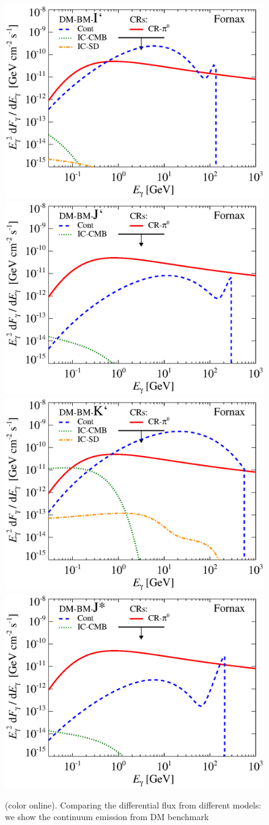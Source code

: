 \documentclass[10pt,aps,pra,reprint,amsmath,amsfonts,amssymb,showpacs,nofootinbib,floatfix]{revtex4-1}
\newcommand{\colo}{(color online). }
\begin{document}
\begin{figure}
\begin{minipage}{2.0\columnwidth}
 \includegraphics[width=0.49\columnwidth]{figures/flux.BMcompI.v14.0.1deg.1.6T.SubMass.IR2.noMW.woGal.eps}
\includegraphics[width=0.49\columnwidth]{figures/flux.BMcompJ.v14.0.1deg.1.6T.SubMass.IR2.noMW.woGal.eps}
\includegraphics[width=0.49\columnwidth]{figures/flux.BMcompK.v14.0.1deg.1.6T.SubMass.IR2.noMW.woGal.eps}
\includegraphics[width=0.49\columnwidth]{figures/flux.BMcompJs.v14.0.1deg.1.6T.SubMass.IR2.noMW.woGal.eps}
\caption{\colo Comparing the differential flux from
  different models: we show the continuum emission from DM benchmark
}
\end{minipage}
\end{figure}
\end{document}
